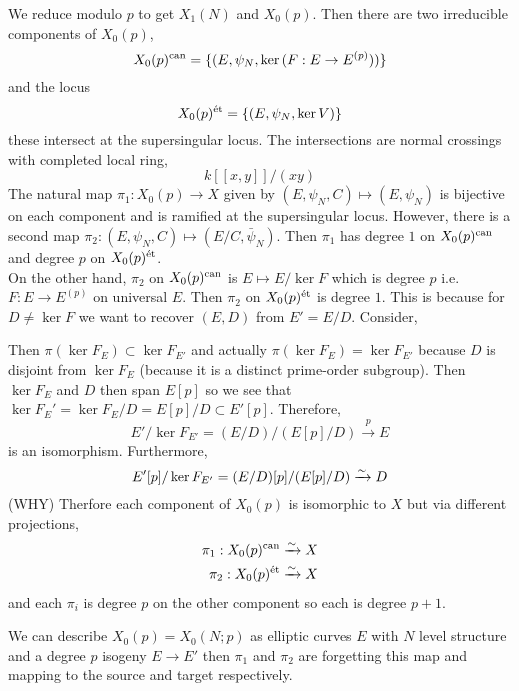 \documentclass[12pt]{article}
\begin{document}
We reduce modulo $p$ to get $X_1(N)$ and $X_0(p)$. Then there are two irreducible components of $X_0(p)$,
\[ X_0(p)^{\mathrm{can}} = \{ (E, \psi_N, \ker{(F : E \to E^{(p)})}) \} \]
and the \etale locus
\[ X_0(p)^{\text{\'{e}t}} = \{ (E, \psi_N, \ker{V}) \} \] 
these intersect at the supersingular locus. The intersections are normal crossings with completed local ring,
\[ k[[x,y]] / (xy) \] 
The natural map $\pi_1 : X_0(p) \to X$ given by $(E, \psi_N, C) \mapsto (E, \psi_N)$ is bijective on each component and is ramified at the supersingular locus. However, there is a second map $\pi_2 : (E, \psi_N, C) \mapsto (E/C, \bar{\psi}_N)$. Then $\pi_1$ has degree $1$ on $X_0(p)^{\mathrm{can}}$ and degree $p$ on $X_0(p)^{\text{\'{e}t}}$. 
\bigskip\\
On the other hand, $\pi_2$ on $X_0(p)^{\mathrm{can}}$ is $E \mapsto E / \ker{F}$ which is degree $p$ i.e. $F : E \to E^{(p)}$ on universal $E$. Then $\pi_2$ on $X_0(p)^{\text{\'{e}t}}$ is degree $1$. This is because for $D \neq \ker{F}$ we want to recover $(E, D)$ from $E' = E / D$. Consider,
\begin{center}
\end{center} 
Then $\pi(\ker{F_E}) \subset \ker{F_{E'}}$ and actually $\pi(\ker{F_E}) = \ker{F_{E'}}$ because $D$ is disjoint from $\ker{F_E}$ (because it is a distinct prime-order subgroup). Then $\ker{F_E}$ and $D$ then span $E[p]$ so we see that $\ker{F_E'} = \ker{F_E} / D = E[p] / D \subset E'[p]$. Therefore, \[ E' / \ker{F_{E'}} = (E/D) / (E[p] / D) \xrightarrow{p} E \]
is an isomorphism. Furthermore,
\[ E'[p] / \ker{F_{E'}} = (E/D) [p] / (E[p] / D) \xrightarrow{\sim} D \]
(WHY)
Therfore each component of $X_0(p)$ is isomorphic to $X$ but via different projections,
\begin{align*}
\pi_1 : X_0(p)^{\mathrm{can}} \xrightarrow{\sim} X
\\
\pi_2 : X_0(p)^{\text{\'{e}t}} \xrightarrow{\sim} X 
\end{align*} 
and each $\pi_i$ is degree $p$ on the other component so each is degree $p+1$. 

\begin{rmk}
We can describe $X_0(p) = X_0(N;p)$ as elliptic curves $E$ with $N$ level structure and a degree $p$ isogeny $E \to E'$ then $\pi_1$ and $\pi_2$ are forgetting this map and mapping to the source and target respectively.
\end{rmk}
\end{document}
